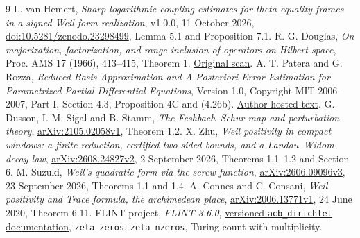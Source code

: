 \documentclass[12pt]{article}
\theoremstyle{remark}\newtheorem{remark}[theorem]{Remark}
\begin{document}
\begin{thebibliography}{9}
 L. van Hemert, \emph{Sharp logarithmic coupling estimates
for theta equality frames in a signed Weil-form realization}, v1.0.0,
11 October 2026, \href{https://doi.org/10.5281/zenodo.23298499}
{doi:10.5281/zenodo.23298499}, Lemma 5.1 and Proposition 7.1.
 R. G. Douglas, \emph{On majorization, factorization,
and range inclusion of operators on Hilbert space}, Proc. AMS 17 (1966),
413--415, Theorem 1. \href{https://home.agh.edu.pl/~rudol/Operat/DouglasFactorizationLemma.pdf}{Original scan}.
 A. T. Patera and G. Rozza, \emph{Reduced Basis Approximation
and A Posteriori Error Estimation for Parametrized Partial Differential
Equations}, Version 1.0, Copyright MIT 2006--2007, Part I,
Section 4.3, Proposition 4C and (4.26b).
\href{https://people.sissa.it/~grozza/wp-content/uploads/2024/10/PR07_Patera_Rozza_book_part1_redux.pdf}{Author-hosted text}.
 G. Dusson, I. M. Sigal and B. Stamm,
\emph{The Feshbach--Schur map and perturbation theory},
\href{https://arxiv.org/abs/2105.02058v1}{arXiv:2105.02058v1}, Theorem 1.2.
 X. Zhu, \emph{Weil positivity in compact windows: a finite
reduction, certified two-sided bounds, and a Landau--Widom decay law},
\href{https://arxiv.org/abs/2608.24827v2}{arXiv:2608.24827v2},
2 September 2026, Theorems 1.1--1.2 and Section 6.
 M. Suzuki, \emph{Weil's quadratic form via the screw
function}, \href{https://arxiv.org/abs/2606.09096v3}{arXiv:2606.09096v3},
23 September 2026, Theorems 1.1 and 1.4.
 A. Connes and C. Consani, \emph{Weil positivity and Trace
formula, the archimedean place},
\href{https://arxiv.org/abs/2006.13771v1}{arXiv:2006.13771v1},
24 June 2020, Theorem 6.11.
 FLINT project, \emph{FLINT 3.6.0},
\href{https://raw.githubusercontent.com/flintlib/flint/v3.6.0/doc/source/acb_dirichlet.rst}
{versioned \texttt{acb\_dirichlet} documentation},
\texttt{zeta\_zeros}, \texttt{zeta\_nzeros}, Turing count with multiplicity.
\end{thebibliography}
\end{document}

